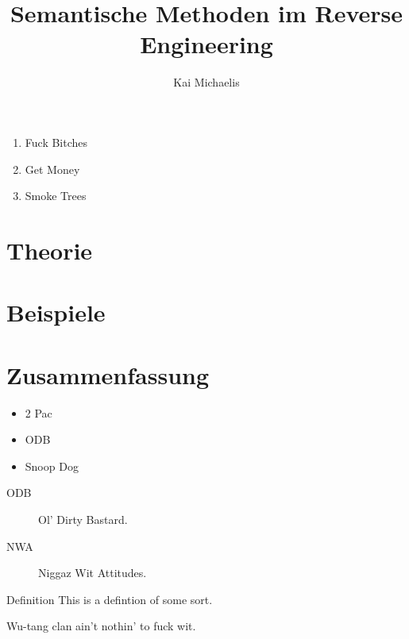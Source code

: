 \documentclass[xetex,mathserif,serif]{beamer}
\title{Semantische Methoden im Reverse Engineering}
\author{Kai Michaelis}
\begin{document}
	\frame{\titlepage}
	\begin{frame}
		\begin{enumerate}
			\item Fuck Bitches
			\item Get Money
			\item Smoke Trees
		\end{enumerate}
	\end{frame}
	\section{Theorie}
	\section{Beispiele}
	\section{Zusammenfassung}

	\begin{frame}
		\blindtext
	\end{frame}

	\begin{frame}
		\begin{itemize}
			\item 2 Pac
			\item ODB
			\item Snoop Dog
		\end{itemize}
	\end{frame}

	\begin{frame}
		\begin{description}
			\item[ODB] Ol' Dirty Bastard.
			\item[NWA] Niggaz Wit Attitudes.
		\end{description}
		\end{frame}

	\begin{frame}
		\begin{block}{Definition}
			This is a defintion of some sort.
		\end{block}
	\end{frame}

	\begin{frame}
		\begin{theorem}[RZA, 1993]
			Wu-tang clan ain't nothin' to fuck wit.
		\end{theorem}
	\end{frame}
\end{document}

